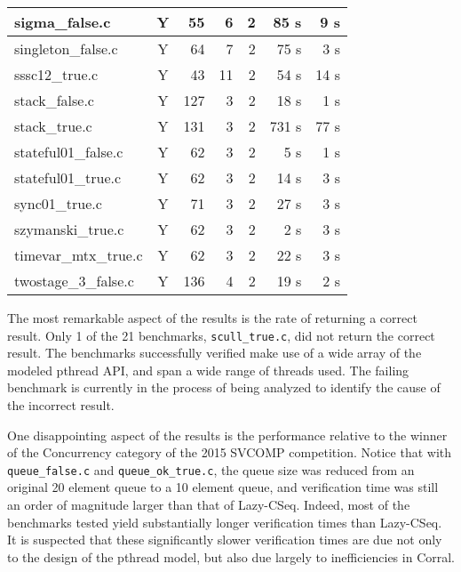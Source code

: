 \begin{table}[h,center]
\begin{tabular}{|l|c|r|r|r|r|r|}
\hline
sigma\_false.c             & Y & 55  & 6       & 2            & 85 s            & 9 s            \\
\hline
singleton\_false.c         & Y & 64  & 7       & 2            & 75 s            & 3 s            \\
\hline
sssc12\_true.c             & Y & 43  & 11      & 2            & 54 s            & 14 s           \\
\hline
stack\_false.c             & Y & 127 & 3       & 2            & 18 s            & 1 s            \\
\hline
stack\_true.c              & Y & 131 & 3       & 2            & 731 s           & 77 s           \\
\hline
stateful01\_false.c        & Y & 62  & 3       & 2            & 5 s             & 1 s            \\
\hline
stateful01\_true.c         & Y & 62  & 3       & 2            & 14 s            & 3 s            \\
\hline
sync01\_true.c             & Y & 71  & 3       & 2            & 27 s            & 3 s            \\
\hline
szymanski\_true.c          & Y & 62  & 3       & 2            & 2 s             & 3 s            \\
\hline
timevar\_mtx\_true.c       & Y & 62  & 3       & 2            & 22 s            & 3 s            \\
\hline
twostage\_3\_false.c       & Y & 136 & 4       & 2            & 19 s            & 2 s            \\
\hline
\end{tabular}
\end{table}

The most remarkable aspect of the results is the rate of returning a
correct result. Only 1 of the 21 benchmarks,
\lstinline[identifierstyle=\color{black}]|scull_true.c|, did not
return the correct result.  The benchmarks successfully verified make
use of a wide array of the modeled pthread API, and span a wide range
of threads used.   The failing benchmark is currently in the process
of being analyzed to identify the cause of the incorrect result.

One disappointing aspect of the results is the performance relative to
the winner of the Concurrency category of the 2015 SVCOMP
competition.  Notice that with
\lstinline[identifierstyle=\color{black}]|queue_false.c| and
\lstinline[identifierstyle=\color{black}]|queue_ok_true.c|, the queue
size was reduced from an original 20 element queue to a 10 element
queue, and verification time was still an order of magnitude larger
than that of Lazy-CSeq.  Indeed, most of the benchmarks tested yield
substantially longer verification times than Lazy-CSeq.  It is
suspected that these significantly slower verification times are due
not only to the design of the pthread model, but also due largely to
inefficiencies in Corral. 

